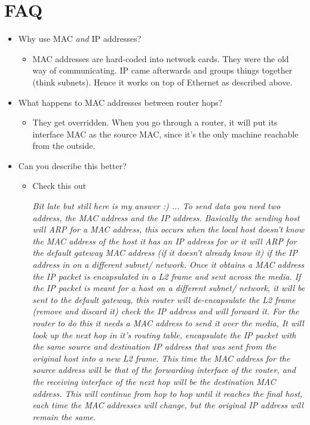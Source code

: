 \documentclass{article}
\begin{document}
\section{FAQ}
\begin{itemize}
    \item Why use MAC \textit{and} IP addresses?
    \begin{itemize}
        \item MAC addresses are hard-coded into network cards. They were the old way of communicating. IP came afterwards and groups things together (think subnets). Hence it works on top of Ethernet as described above.
    \end{itemize}

    \item What happens to MAC addresses between router hops?
    \begin{itemize}
        \item They get overridden. When you go through a router, it will put its interface MAC as the source MAC, since it's the only machine reachable from the outside.
    \end{itemize}

    \item Can you describe this better?
    \begin{itemize}
        \item Check this out
        
        \textit{
        Bit late but still here is my answer :) ... To send data you need two address, the MAC address and the IP address. Basically the sending host will ARP for a MAC address, this occurs when the local host doesn't know the MAC address of the host it has an IP address for or it will ARP for the default gateway MAC address (if it doesn't already know it) if the IP address in on a different subnet/ network. Once it obtains a MAC address the IP packet is encapsulated in a L2 frame and sent across the media. If the IP packet is meant for a host on a different subnet/ network, it will be sent to the default gateway, this router will de-encapsulate the L2 frame (remove and discard it) check the IP address and will forward it. For the router to do this it needs a MAC address to send it over the media, It will look up the next hop in it's routing table, encapsulate the IP packet with the same source and destination IP address that was sent from the original host into a new L2 frame. This time the MAC address for the source address will be that of the forwarding interface of the router, and the receiving interface of the next hop will be the destination MAC address. This will continue from hop to hop until it reaches the final host, each time the MAC addresses will change, but the original IP address will remain the same.}
    \end{itemize}
\end{itemize}
\end{document}
